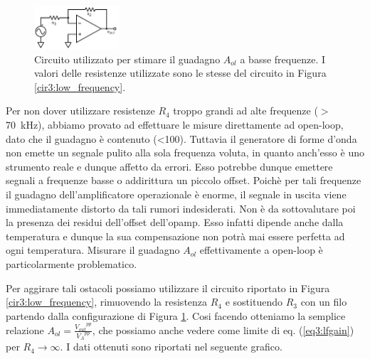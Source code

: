 \begin{figure}
  \begin{center}
    \includegraphics[width=0.28\textwidth]{../E03/latex/HF_ol.pdf}
  \end{center}
  \caption{Circuito utilizzato per stimare il guadagno $A_{ol}$ a basse frequenze. I valori delle resistenze utilizzate sono le stesse del circuito in Figura \ref{cir3:low_frequency}.}
  \label{cir3:high_frequency}
\end{figure}

Per non dover utilizzare resistenze $R_4$ troppo grandi ad alte frequenze ($>$ \SI{70}{\kilo\hertz}), abbiamo provato ad effettuare le misure direttamente ad open-loop, dato che il guadagno è contenuto (\num{<100}).
Tuttavia il generatore di forme d'onda non emette un segnale pulito alla sola frequenza voluta, in quanto anch'esso è uno strumento reale e dunque affetto da errori.
Esso potrebbe dunque emettere segnali a frequenze basse o addirittura un piccolo offset.
Poichè per tali frequenze il guadagno dell'amplificatore operazionale è enorme, il segnale in uscita viene immediatamente distorto da tali rumori indesiderati.
Non è da sottovalutare poi la presenza dei residui dell'offset dell'opamp.
Esso infatti dipende anche dalla temperatura e dunque la sua compensazione non potrà mai essere perfetta ad ogni temperatura.
Misurare il guadagno $A_{ol}$ effettivamente a open-loop è particolarmente problematico.

Per aggirare tali ostacoli possiamo utilizzare il circuito riportato in Figura \ref{cir3:low_frequency}, rimuovendo la resistenza $R_4$ e sostituendo $R_3$ con un filo partendo dalla configurazione di Figura \ref{cir3:high_frequency}.
Cosi facendo otteniamo la semplice relazione $A_{ol}=\frac{{V_{out}}^{pp}}{{V_A}^{pp}}$, che possiamo anche vedere come limite di eq. (\ref{eq3:lfgain}) per $R_4 \rightarrow \infty$.
I dati ottenuti sono riportati nel seguente grafico. 

